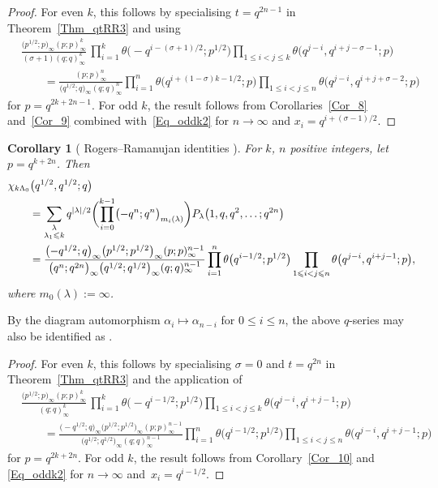 \documentclass[pdftex]{sigma}
\numberwithin{equation}{section}
\newtheorem{Corollary}[Theorem]{Corollary}
\renewcommand{\leq}{\leqslant}
\newcommand{\abs}[1]{\vert#1\vert}
\newcommand{\la}{\lambda}
\newcommand{\La}{\Lambda}
\begin{document}
\begin{proof}
For even $k$, this follows by specialising $t=q^{2n-1}$ in
Theorem~\ref{Thm_qtRR3} and using
\begin{align*}
&\frac{\bigl(p^{1/2};p\bigr)_{\infty}
(p;p)_{\infty}^k}{(\sigma+1)(q;q)_{\infty}^k}\,
\prod_{i=1}^k \theta\bigl({-}q^{i-(\sigma+1)/2};p^{1/2}\bigr)
\prod_{1\leq i<j\leq k}\theta\bigl(q^{j-i},q^{i+j-\sigma-1};p\bigr) \\
&\qquad=\frac{(p;p)_{\infty}^n}{\bigl(q^{1/2};q\bigr)_{\infty}(q;q)_{\infty}^n}
\prod_{i=1}^n \theta\bigl(q^{i+(1-\sigma)k-1/2};p\bigr)
\prod_{1\leq i<j\leq n} \theta\bigl(q^{j-i},q^{i+j+\sigma-2};p\bigr)
\end{align*}
for $p=q^{2k+2n-1}$.
For odd $k$, the result follows from Corollaries~\ref{Cor_8} and~\ref{Cor_9} combined with~\eqref{Eq_oddk2} for $n\to\infty$ and $x_i=q^{i+(\sigma-1)/2}$.
\end{proof}

\begin{Corollary}[ Rogers--Ramanujan identities
{\cite[Theorem 5.14]{RW21}}]
For $k$, $n$ positive integers, let $p=q^{k+2n}$.
Then
\begin{align*}
&\chi_{k\La_0}\bigl(q^{1/2},q^{1/2};q\bigr) \\
&\qquad=\sum_{\substack{\la \\[1pt] \la_1\leq k}}
q^{\abs{\la}/2}
\biggl(\prod_{i=0}^{k-1}\bigl({-}q^n;q^n\bigr)_{m_i(\la)}\biggr)
P_{\la}\bigl(1,q,q^2,\dots;q^{2n}\bigr) \\
&\qquad=\frac{\bigl(-q^{1/2};q\bigr)_{\infty}
\bigl(p^{1/2};p^{1/2}\bigr)_{\infty}(p;p)_{\infty}^{n-1}}
{\bigl(q^n;q^{2n}\bigr)_{\infty}\bigl(q^{1/2};q^{1/2}\bigr)_{\infty}(q;q)_{\infty}^{n-1}}
\prod_{i=1}^n \theta\bigl(q^{i-1/2};p^{1/2}\bigr)
\prod_{1\leq i<j\leq n} \theta\bigl(q^{j-i},q^{i+j-1};p\bigr),
\notag
\end{align*}
where $m_0(\la):=\infty$.
\end{Corollary}

By the  diagram automorphism
$\alpha_i\mapsto\alpha_{n-i}$ for $0\leq i\leq n$, the above $q$-series
may also be identified as \smash{$\chi_{k\La_n}\bigl(q^{1/2},q^{1/2};q\bigr)$}.

\begin{proof}
For even $k$, this follows by specialising $\sigma=0$ and $t=q^{2n}$ in
Theorem~\ref{Thm_qtRR3} and the application of
\begin{align*}
&\frac{\bigl(p^{1/2};p\bigr)_{\infty}
(p;p)_{\infty}^k}{(q;q)_{\infty}^k}\,
\prod_{i=1}^k \theta\bigl({-}q^{i-1/2};p^{1/2}\bigr)
\prod_{1\leq i<j\leq k}\theta\bigl(q^{j-i},q^{i+j-1};p\bigr) \\
&\qquad=\frac{\bigl(-q^{1/2};q\bigr)_{\infty}\bigl(p^{1/2};p^{1/2}\bigr)_{\infty}
(p;p)_{\infty}^{n-1}}{\bigl(q^{1/2};q^{1/2}\bigr)_{\infty}(q;q)_{\infty}^{n-1}}
\prod_{i=1}^n \theta\bigl(q^{i-1/2};p^{1/2}\bigr)
\prod_{1\leq i<j\leq n} \theta\bigl(q^{j-i},q^{i+j-1};p\bigr)
\end{align*}
for $p=q^{2k+2n}$.
For odd $k$, the result follows from Corollary~\ref{Cor_10}
and \eqref{Eq_oddk2} for $n\to\infty$ and~${x_i=q^{i-1/2}}$.
\end{proof}
\end{document}
